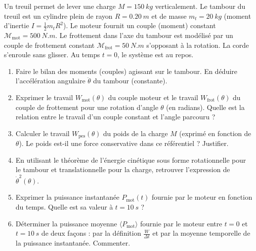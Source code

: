 \documentclass[11pt]{article}
\begin{document}
\begin{exercice}
Un treuil permet de lever une charge $M = \SI{150}{kg}$ verticalement. Le tambour du treuil est un cylindre plein de rayon $R = \SI{0,20}{m}$ et de masse $m_t = \SI{20}{kg}$ (moment d'inertie $I = \frac{1}{2}m_t R^2$). Le moteur fournit un couple (moment) constant $\mathcal{M}_{\text{mot}} = \SI{500}{N.m}$. Le frottement dans l'axe du tambour est modélisé par un couple de frottement constant $\mathcal{M}_{\text{frot}} = \SI{50}{N.m}$ s'opposant à la rotation. La corde s'enroule sans glisser. Au temps $t=0$, le système est au repos.
\begin{enumerate}
    \item Faire le bilan des moments (couples) agissant sur le tambour. En déduire l'accélération angulaire $\ddot{\theta}$ du tambour (constante).
    \item Exprimer le travail $W_{\text{mot}}(\theta)$ du couple moteur et le travail $W_{\text{frot}}(\theta)$ du couple de frottement pour une rotation d'angle $\theta$ (en radians). Quelle est la relation entre le travail d'un couple constant et l'angle parcouru ?
    \item Calculer le travail $W_{\text{pes}}(\theta)$ du poids de la charge $M$ (exprimé en fonction de $\theta$). Le poids est-il une force conservative dans ce référentiel ? Justifier.
    \item En utilisant le théorème de l'énergie cinétique sous forme rotationnelle pour le tambour et translationnelle pour la charge, retrouver l'expression de $\dot{\theta}^2(\theta)$.
    \item Exprimer la puissance instantanée $P_{\text{mot}}(t)$ fournie par le moteur en fonction du temps. Quelle est sa valeur à $t = \SI{10}{s}$ ?
    \item Déterminer la puissance moyenne $\langle P_{\text{mot}} \rangle$ fournie par le moteur entre $t=0$ et $t = \SI{10}{s}$ de deux façons : par la définition $\frac{W}{\Delta t}$ et par la moyenne temporelle de la puissance instantanée. Commenter.
\end{enumerate}
\end{exercice}
\end{document}
